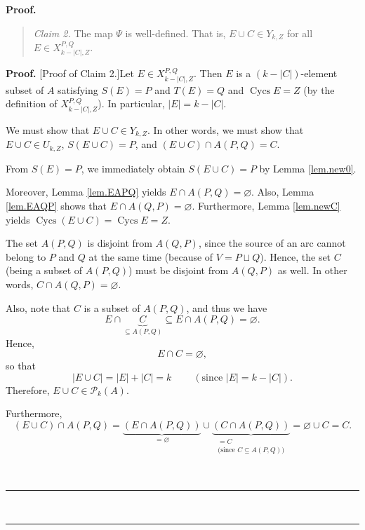 \documentclass[numbers=enddot,12pt,final,onecolumn,notitlepage]{scrartcl}%
\theoremstyle{definition}
\newenvironment{statement}{\begin{quote}}{\end{quote}}
\newenvironment{proof}[1][Proof]{\noindent\textbf{#1.} }{\ \rule{0.5em}{0.5em}}
\theoremstyle{plainsl}
\begin{document}
\begin{proof}
\begin{statement}
\textit{Claim 2.} The map $\Psi$ is well-defined. That is, $E\cup C\in
Y_{k,Z}$ for all $E\in X_{k-\left\vert C\right\vert ,Z}^{P,Q}$.
\end{statement}

\begin{proof}
[Proof of Claim 2.]Let $E\in X_{k-\left\vert C\right\vert ,Z}^{P,Q}$. Then $E$
is a $\left(  k-\left\vert C\right\vert \right)  $-element subset of $A$
satisfying $S\left(  E\right)  =P$ and $T\left(  E\right)  =Q$ and
$\operatorname*{Cycs}E=Z$ (by the definition of $X_{k-\left\vert C\right\vert
,Z}^{P,Q}$). In particular, $\left\vert E\right\vert =k-\left\vert
C\right\vert $.

We must show that $E\cup C\in Y_{k,Z}$. In other words, we must show that
$E\cup C\in U_{k,Z}$, $S\left(  E\cup C\right)  =P$, and $\left(  E\cup
C\right)  \cap A\left(  P,Q\right)  =C$.

From $S\left(  E\right)  =P$, we immediately obtain $S\left(  E\cup C\right)
=P$ by Lemma \ref{lem.new0}.

Moreover, Lemma \ref{lem.EAPQ} yields $E\cap A\left(  P,Q\right)
=\varnothing$. Also, Lemma \ref{lem.EAQP} shows that $E\cap A\left(
Q,P\right)  =\varnothing$. Furthermore, Lemma \ref{lem.newC} yields
$\operatorname*{Cycs}\left(  E\cup C\right)  =\operatorname*{Cycs}E=Z$.

The set $A\left(  P,Q\right)  $ is disjoint from $A\left(  Q,P\right)  $,
since the source of an arc cannot belong to $P$ and $Q$ at the same time
(because of $V=P\sqcup Q$). Hence, the set $C$ (being a subset of $A\left(
P,Q\right)  $) must be disjoint from $A\left(  Q,P\right)  $ as well. In other
words, $C\cap A\left(  Q,P\right)  =\varnothing$.

Also, note that $C$ is a subset of $A\left(  P,Q\right)  $, and thus we have
\[
E\cap\underbrace{C}_{\subseteq A\left(  P,Q\right)  }\subseteq E\cap A\left(
P,Q\right)  =\varnothing.
\]
Hence,
\begin{equation}
E\cap C=\varnothing, \label{pf.lem.new4.c2.pf.empty}%
\end{equation}
so that%
\[
\left\vert E\cup C\right\vert =\left\vert E\right\vert +\left\vert
C\right\vert =k\ \ \ \ \ \ \ \ \ \ \left(  \text{since }\left\vert
E\right\vert =k-\left\vert C\right\vert \right)  .
\]
Therefore, $E\cup C\in\mathcal{P}_{k}\left(  A\right)  $.

Furthermore,%
\[
\left(  E\cup C\right)  \cap A\left(  P,Q\right)  =\underbrace{\left(  E\cap
A\left(  P,Q\right)  \right)  }_{=\varnothing}\cup\underbrace{\left(  C\cap
A\left(  P,Q\right)  \right)  }_{\substack{=C\\\text{(since }C\subseteq
A\left(  P,Q\right)  \text{)}}}=\varnothing\cup C=C.
\]



\end{proof}
\end{proof}
\end{document}
